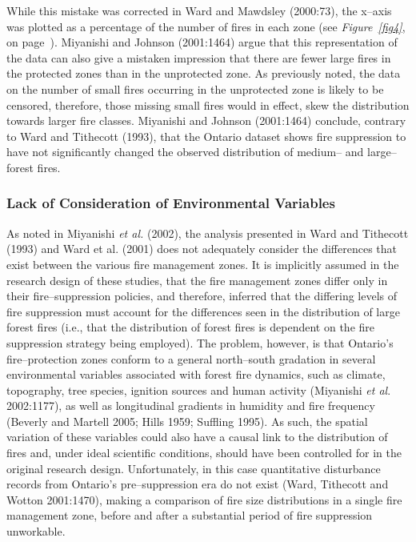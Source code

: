 \begin{spacing}{1.5}
\clearpage

\noindent While this mistake was corrected in Ward and Mawdsley (2000:73), the x--axis was plotted as a percentage of the number of fires in each zone (see \emph{Figure~\ref{fig4}}, on page~\pageref{fig4}). Miyanishi and Johnson (2001:1464) argue that this representation of the data can also give a mistaken impression that there are fewer large fires in the protected zones than in the unprotected zone. As previously noted, the data on the number of small fires occurring in the unprotected zone is likely to be censored, therefore, those missing small fires would in effect, skew the distribution towards larger fire classes. Miyanishi and Johnson (2001:1464) conclude, contrary to Ward and Tithecott (1993), that the Ontario dataset shows fire suppression to have not significantly changed the observed distribution of medium-- and large--forest fires.

\subsubsection{Lack of Consideration of Environmental Variables}

As noted in Miyanishi \emph{et al.} (2002), the analysis presented in Ward and Tithecott (1993) and Ward et al. (2001) does not adequately consider the  differences that exist between the various fire management zones. It is implicitly assumed in the research design of these studies, that the fire management zones differ only in their fire--suppression policies, and therefore, inferred that the differing levels of fire suppression must account for the differences seen in the distribution of large forest fires (i.e., that the distribution of forest fires is dependent on the fire suppression strategy being employed). The problem, however, is that Ontario's fire--protection zones conform to a general north--south gradation in several environmental variables associated with forest fire dynamics, such as climate, topography, tree species, ignition sources and human activity (Miyanishi \emph{et al}. 2002:1177), as well as longitudinal gradients in humidity and fire frequency (Beverly and Martell 2005; Hills 1959; Suffling 1995). As such, the spatial variation of these variables could also have a causal link to the distribution of fires and, under ideal scientific conditions, should have been controlled for in the original research design. Unfortunately, in this case quantitative disturbance records from Ontario's pre--suppression era do not exist (Ward, Tithecott and Wotton 2001:1470), making a comparison of fire size distributions in a single fire management zone, before and after a substantial period of fire suppression unworkable.


\end{spacing}
